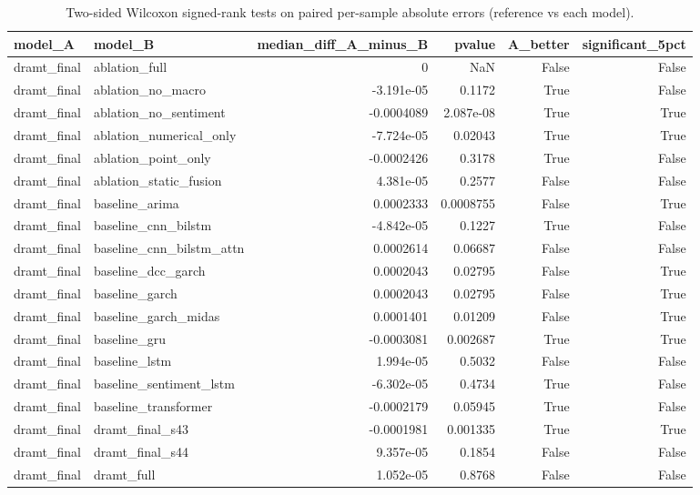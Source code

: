 \begin{table}
\caption{Two-sided Wilcoxon signed-rank tests on paired per-sample absolute errors (reference vs each model).}
\label{tab:wilcoxon}
\begin{tabular}{llrrrr}
\toprule
model_A & model_B & median_diff_A_minus_B & pvalue & A_better & significant_5pct \\
\midrule
dramt_final & ablation_full & 0 & NaN & False & False \\
dramt_final & ablation_no_macro & -3.191e-05 & 0.1172 & True & False \\
dramt_final & ablation_no_sentiment & -0.0004089 & 2.087e-08 & True & True \\
dramt_final & ablation_numerical_only & -7.724e-05 & 0.02043 & True & True \\
dramt_final & ablation_point_only & -0.0002426 & 0.3178 & True & False \\
dramt_final & ablation_static_fusion & 4.381e-05 & 0.2577 & False & False \\
dramt_final & baseline_arima & 0.0002333 & 0.0008755 & False & True \\
dramt_final & baseline_cnn_bilstm & -4.842e-05 & 0.1227 & True & False \\
dramt_final & baseline_cnn_bilstm_attn & 0.0002614 & 0.06687 & False & False \\
dramt_final & baseline_dcc_garch & 0.0002043 & 0.02795 & False & True \\
dramt_final & baseline_garch & 0.0002043 & 0.02795 & False & True \\
dramt_final & baseline_garch_midas & 0.0001401 & 0.01209 & False & True \\
dramt_final & baseline_gru & -0.0003081 & 0.002687 & True & True \\
dramt_final & baseline_lstm & 1.994e-05 & 0.5032 & False & False \\
dramt_final & baseline_sentiment_lstm & -6.302e-05 & 0.4734 & True & False \\
dramt_final & baseline_transformer & -0.0002179 & 0.05945 & True & False \\
dramt_final & dramt_final_s43 & -0.0001981 & 0.001335 & True & True \\
dramt_final & dramt_final_s44 & 9.357e-05 & 0.1854 & False & False \\
dramt_final & dramt_full & 1.052e-05 & 0.8768 & False & False \\
\bottomrule
\end{tabular}
\end{table}
